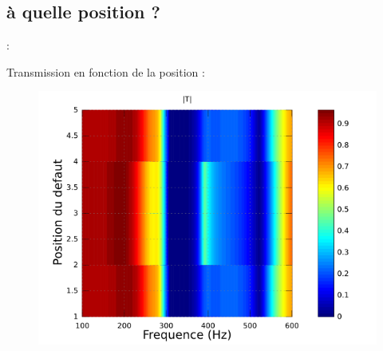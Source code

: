 \documentclass[12pt,xcolor=x11names,compress, notes=show]{beamer}%
\begin{document}
\subsection{à quelle position ?}
\begin{frame}{\insertsectionhead : \insertsubsectionhead}


Transmission en fonction de la position :
\begin{figure}
	\centering
	\includegraphics[scale=0.5]{pos_singu.png}
\end{figure}
\end{frame}
\end{document}
